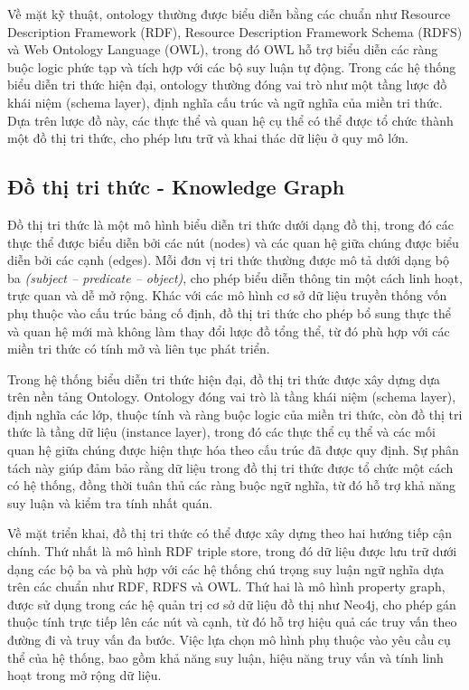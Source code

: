 Về mặt kỹ thuật, ontology thường được biểu diễn bằng các chuẩn như Resource Description Framework (RDF), Resource Description Framework Schema (RDFS) và Web Ontology Language (OWL), trong đó OWL hỗ trợ biểu diễn các ràng buộc logic phức tạp và tích hợp với các bộ suy luận tự động. Trong các hệ thống biểu diễn tri thức hiện đại, ontology thường đóng vai trò như một tầng lược đồ khái niệm (schema layer), định nghĩa cấu trúc và ngữ nghĩa của miền tri thức. Dựa trên lược đồ này, các thực thể và quan hệ cụ thể có thể được tổ chức thành một đồ thị tri thức, cho phép lưu trữ và khai thác dữ liệu ở quy mô lớn.

\subsection{Đồ thị tri thức - Knowledge Graph}

Đồ thị tri thức là một mô hình biểu diễn tri thức dưới dạng đồ thị, trong đó các thực thể được biểu diễn bởi các nút (nodes) và các quan hệ giữa chúng được biểu diễn bởi các cạnh (edges). Mỗi đơn vị tri thức thường được mô tả dưới dạng bộ ba \textit{(subject – predicate – object)}, cho phép biểu diễn thông tin một cách linh hoạt, trực quan và dễ mở rộng. Khác với các mô hình cơ sở dữ liệu truyền thống vốn phụ thuộc vào cấu trúc bảng cố định, đồ thị tri thức cho phép bổ sung thực thể và quan hệ mới mà không làm thay đổi lược đồ tổng thể, từ đó phù hợp với các miền tri thức có tính mở và liên tục phát triển.

Trong hệ thống biểu diễn tri thức hiện đại, đồ thị tri thức được xây dựng dựa trên nền tảng Ontology. Ontology đóng vai trò là tầng khái niệm (schema layer), định nghĩa các lớp, thuộc tính và ràng buộc logic của miền tri thức, còn đồ thị tri thức là tầng dữ liệu (instance layer), trong đó các thực thể cụ thể và các mối quan hệ giữa chúng được hiện thực hóa theo cấu trúc đã được quy định. Sự phân tách này giúp đảm bảo rằng dữ liệu trong đồ thị tri thức được tổ chức một cách có hệ thống, đồng thời tuân thủ các ràng buộc ngữ nghĩa, từ đó hỗ trợ khả năng suy luận và kiểm tra tính nhất quán.

Về mặt triển khai, đồ thị tri thức có thể được xây dựng theo hai hướng tiếp cận chính. Thứ nhất là mô hình RDF triple store, trong đó dữ liệu được lưu trữ dưới dạng các bộ ba và phù hợp với các hệ thống chú trọng suy luận ngữ nghĩa dựa trên các chuẩn như RDF, RDFS và OWL. Thứ hai là mô hình property graph, được sử dụng trong các hệ quản trị cơ sở dữ liệu đồ thị như Neo4j, cho phép gán thuộc tính trực tiếp lên các nút và cạnh, từ đó hỗ trợ hiệu quả các truy vấn theo đường đi và truy vấn đa bước. Việc lựa chọn mô hình phụ thuộc vào yêu cầu cụ thể của hệ thống, bao gồm khả năng suy luận, hiệu năng truy vấn và tính linh hoạt trong mở rộng dữ liệu.

